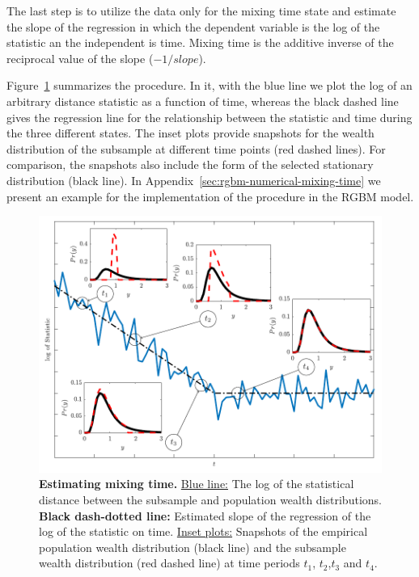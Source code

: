 \documentclass[11pt]{article}
\newcommand{\Fref}[1]{Figure~\ref{fig:#1}}
\numberwithin{equation}{section}
\begin{document}
The last step is to utilize the data only for the mixing time state and estimate the slope of the regression in which the dependent variable is the log of the statistic an the independent is time. Mixing time is the additive inverse of the reciprocal value of the slope ($-1/slope$).

\Fref{mixing-time} summarizes the procedure. In it, with the blue line we plot the log of an arbitrary distance statistic as a function of time, whereas the black dashed line gives the regression line for the relationship between the statistic and time during the three different states. The inset plots provide snapshots for the wealth distribution of the subsample at different time points (red dashed lines). For comparison, the snapshots also include the form of the selected stationary distribution (black line). In Appendix~\ref{sec:rgbm-numerical-mixing-time} we present an example for the implementation of the procedure in the RGBM model.

\begin{figure}[!htb]
\centering
\includegraphics[width=1.0\textwidth]{figs/fig_mixing_time.pdf}
\caption{\textbf{Estimating mixing time.} \underline{Blue line:} The log of the statistical distance between the subsample and population wealth distributions. \textbf{Black dash-dotted line:} Estimated slope of the regression of the log of the statistic on time. \underline{Inset plots:} Snapshots of the empirical population wealth distribution (black line) and the subsample wealth distribution (red dashed line) at time periods $t_1$, $t_2$,$t_3$ and $t_4$.  \label{fig:mixing-time}}
\end{figure}
\FloatBarrier
\end{document}
